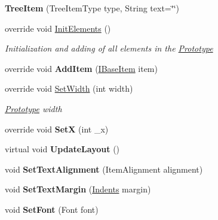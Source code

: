 \begin{DoxyCompactItemize}
{\bfseries Tree\+Item} (Tree\+Item\+Type type, String text=\char`\"{}\char`\"{})
\item 
override void \mbox{\hyperlink{class_space_v_i_l_1_1_tree_item_a4f40a1de34aa41b1eff340f98de81756}{Init\+Elements}} ()
\begin{DoxyCompactList}\small\item\em Initialization and adding of all elements in the \mbox{\hyperlink{class_space_v_i_l_1_1_prototype}{Prototype}} \end{DoxyCompactList}\item 
\mbox{\label{class_space_v_i_l_1_1_tree_item_afc527b031a24b41b87a112499dbf519d}} 
override void {\bfseries Add\+Item} (\mbox{\hyperlink{interface_space_v_i_l_1_1_core_1_1_i_base_item}{I\+Base\+Item}} item)
\item 
override void \mbox{\hyperlink{class_space_v_i_l_1_1_tree_item_aa10abe8a9dafe4d597e041500618ec03}{Set\+Width}} (int width)
\begin{DoxyCompactList}\small\item\em \mbox{\hyperlink{class_space_v_i_l_1_1_prototype}{Prototype}} width \end{DoxyCompactList}\item 
\mbox{\label{class_space_v_i_l_1_1_tree_item_a2877488261c222803eccf707acb64996}} 
override void {\bfseries SetX} (int \+\_\+x)
\item 
\mbox{\label{class_space_v_i_l_1_1_tree_item_a7d2a8703ad575a79706ad74261f62a8e}} 
virtual void {\bfseries Update\+Layout} ()
\item 
\mbox{\label{class_space_v_i_l_1_1_tree_item_a4efa275845c0e6504b3e2765a9fc4af1}} 
void {\bfseries Set\+Text\+Alignment} (Item\+Alignment alignment)
\item 
\mbox{\label{class_space_v_i_l_1_1_tree_item_a11b424f22eb57f927c717860e190f359}} 
void {\bfseries Set\+Text\+Margin} (\mbox{\hyperlink{struct_space_v_i_l_1_1_decorations_1_1_indents}{Indents}} margin)
\item 
\mbox{\label{class_space_v_i_l_1_1_tree_item_a3930da98caf1fc9041c3c87a321636d7}} 
void {\bfseries Set\+Font} (Font font)

\end{DoxyCompactItemize}
